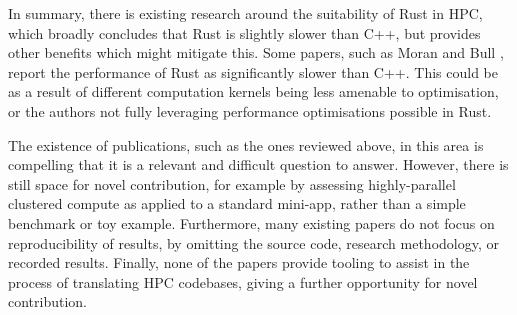 \enlargethispage{1\baselineskip}

In summary, there is existing research around the suitability of Rust in \acrshort{HPC}, which broadly concludes that Rust is slightly slower than C++, but provides other benefits which might mitigate this. Some papers, such as Moran and Bull \cite{moranEmergingTechnologiesRust2023}, report the performance of Rust as significantly slower than C++. This could be as a result of different computation kernels being less amenable to optimisation, or the authors not fully leveraging performance optimisations possible in Rust.

The existence of publications, such as the ones reviewed above, in this area is compelling that it is a relevant and difficult question to answer. However, there is still space for novel contribution, for example by assessing highly-parallel clustered compute as applied to a standard \acrshort{mini-app}, rather than a simple benchmark or toy example. Furthermore, many existing papers do not focus on reproducibility of results, by omitting the source code, research methodology, or recorded results. Finally, none of the papers provide tooling to assist in the process of translating \acrshort{HPC} codebases, giving a further opportunity for novel contribution.
